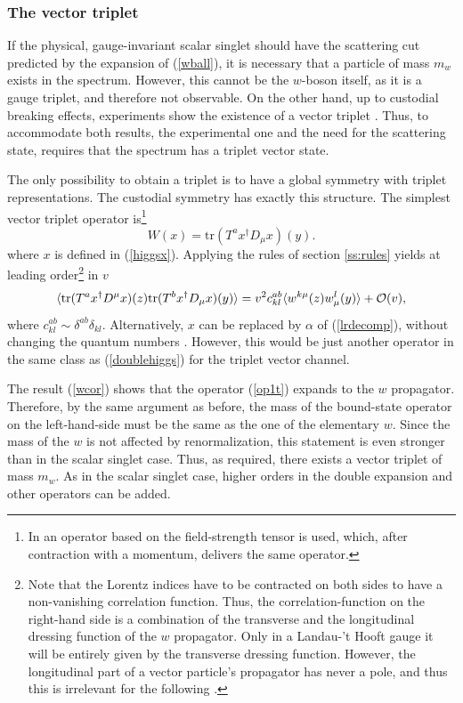 \documentclass[final,12pt]{article}
\newcommand*{\no}{\noindent}
\newcommand*{\be}{\begin{equation}}
\newcommand*{\ee}{\end{equation}}
\newcommand*{\pref}[1]{(\ref{#1})}
\newcommand*{\tr}{\mathrm{tr}}
\newcommand*{\1}{1\!\!\!\bot}
\begin{document}
\subsubsection{The vector triplet}

If the physical, gauge-invariant scalar singlet should have the scattering cut predicted by the expansion of \pref{wball}, it is necessary that a particle of mass $m_w$ exists in the spectrum. However, this cannot be the $w$-boson itself, as it is a gauge triplet, and therefore not observable. On the other hand, up to custodial breaking effects, experiments show the existence of a vector triplet \cite{pdg}. Thus, to accommodate both results, the experimental one and the need for the scattering state, requires that the spectrum has a triplet vector state.

The only possibility to obtain a triplet is to have a global symmetry with triplet representations. The custodial symmetry has exactly this structure. The simplest vector triplet operator is\footnote{In \cite{Frohlich:1980gj,Frohlich:1981yi} an operator based on the field-strength tensor is used, which, after contraction with a momentum, delivers the same operator.} \cite{'tHooft:1979bj,Evertz:1985fc,Maas:2012tj,Maas:2013aia}
\be
W(x)=\tr\left(T^ax^\dagger D_\mu x\right)(y)\label{op1t}.
\ee
\no where $x$ is defined in \pref{higgsx}. Applying the rules of section \ref{ss:rules} yields at leading order\footnote{Note that the Lorentz indices have to be contracted on both sides to have a non-vanishing correlation function. Thus, the correlation-function on the right-hand side is a combination of the transverse and the longitudinal dressing function of the $w$ propagator. Only in a Landau-'t Hooft gauge it will be entirely given by the transverse dressing function. However, the longitudinal part of a vector particle's propagator has never a pole, and thus this is irrelevant for the following \cite{Raubitzek:unpublished}.} in $v$
\be
\langle\tr(T^ax^\dagger D^\mu x)(z)\tr(T^bx^\dagger D_\mu x)(y)\rangle=
v^2c^{ab}_{kl}\langle w^{k\mu}(z) w^l_\mu(y)\rangle+{\cal O}(v)\label{wcor},
\ee
\no where  $c^{ab}_{kl}\sim\delta^{ab}\delta_{kl}$. Alternatively, $x$ can be replaced by $\alpha$ of \pref{lrdecomp}, without changing the quantum numbers \cite{Evertz:1985fc}. However, this would be just another operator in the same class as \pref{doublehiggs} for the triplet vector channel.

The result \pref{wcor} shows that the operator \pref{op1t} expands to the $w$ propagator. Therefore, by the same argument as before, the mass of the bound-state operator on the left-hand-side must be the same as the one of the elementary $w$. Since the mass of the $w$ is not affected by renormalization, this statement is even stronger than in the scalar singlet case. Thus, as required, there exists a vector triplet of mass $m_w$. As in the scalar singlet case, higher orders in the double expansion and other operators can be added.
\end{document}
